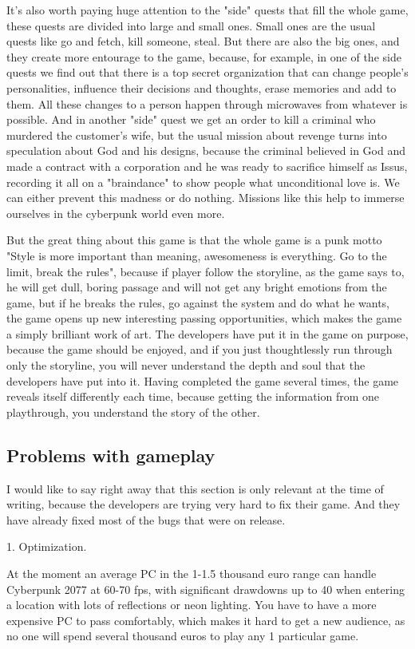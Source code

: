 \documentclass[10pt,twoside,english,a4paper]{article}
\begin{document}
	It's also worth paying huge attention to the "side" quests that fill the whole game, these quests are divided into large and small ones. Small ones are the usual quests like go and fetch, kill someone, steal. But there are also the big ones, and they create more entourage to the game, because, for example, in one of the side quests we find out that there is a top secret organization that can change people's personalities, influence their decisions and thoughts, erase memories and add to them. All these changes to a person happen through microwaves from whatever is possible. And in another "side" quest we get an order to kill a criminal who murdered the customer's wife, but the usual mission about revenge turns into speculation about God and his designs, because the criminal believed in God and made a contract with a corporation and he was ready to sacrifice himself as Issus, recording it all on a "braindance" to show people what unconditional love is. We can either prevent this madness or do nothing. Missions like this help to immerse ourselves in the cyberpunk world even more.

	But the great thing about this game is that the whole game is a punk motto "Style is more important than meaning, awesomeness is everything. Go to the limit, break the rules", because if player follow the storyline, as the game says to, he will get dull, boring passage and will not get any bright emotions from the game, but if he breaks the rules, go against the system and do what he wants, the game opens up new interesting passing opportunities, which makes the game a simply brilliant work of art. The developers have put it in the game on purpose, because the game should be enjoyed, and if you just thoughtlessly run through only the storyline, you will never understand the depth and soul that the developers have put into it. Having completed the game several times, the game reveals itself differently each time, because getting the information from one playthrough, you understand the story of the other.
\subsection{Problems with gameplay}\label{problems}
	I would like to say right away that this section is only relevant at the time of writing, because the developers are trying very hard to fix their game. And they have already fixed most of the bugs that were on release.

1. Optimization.

At the moment an average PC in the 1-1.5 thousand euro range can handle Cyberpunk 2077 at 60-70 fps, with significant drawdowns up to 40 when entering a location with lots of reflections or neon lighting. You have to have a more expensive PC to pass comfortably, which makes it hard to get a new audience, as no one will spend several thousand euros to play any 1 particular game.
\end{document}
